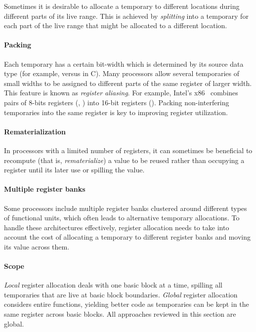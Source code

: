 \documentclass[acmsmall,authorversion,nonacm]{acmart}
\begin{document}
Sometimes it is desirable to allocate a temporary  to different
locations during different parts of its live range.
This is achieved by \emph{splitting}  into a temporary for each
part of the live range that might be allocated to a different
location.

\paragraph{Packing}

Each temporary has a certain bit-width which is determined by its
source data type (for example,  versus  in C).
Many processors allow several temporaries of small widths to be
assigned to different parts of the same register of larger width.
This feature is known as \emph{register aliasing}.
For example, Intel's x86~\cite{x86} combines pairs of 8-bits
registers (, ) into 16-bit registers
().
Packing non-interfering temporaries into the same register is key to
improving register utilization.

\paragraph{Rematerialization}

In processors with a limited number of registers, it can sometimes be
beneficial to recompute (that is, \emph{rematerialize}) a value to be
reused rather than occupying a register until its later use or
spilling the value.

\paragraph{Multiple register banks}

Some processors include multiple register banks clustered around
different types of functional units, which often leads to alternative
temporary allocations.
To handle these architectures effectively, register allocation needs
to take into account the cost of allocating a temporary to different
register banks and moving its value across them.

\paragraph{Scope}

\emph{Local} register allocation deals with one basic block at a time,
spilling all temporaries that are live at basic block boundaries.
\emph{Global} register allocation considers entire functions, yielding
better code as temporaries can be kept in the same register across
basic blocks.
All approaches reviewed in this section are global.
\end{document}
